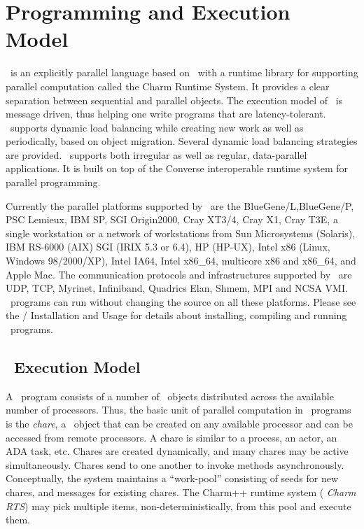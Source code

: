 \section{Programming and Execution Model}

\charmpp\ is an explicitly parallel language based on \CC\ with a runtime
library for supporting parallel computation called the Charm Runtime System.  It
provides a clear separation between sequential and parallel objects.  The
execution model of \charmpp\ is message driven, thus helping one write programs
that are latency-tolerant.  \charmpp\ supports dynamic load balancing while
creating new work as well as periodically, based on object migration.  Several
dynamic load balancing strategies are provided.  \charmpp\ supports both
irregular as well as regular, data-parallel applications.  It is built on top of the
{\sc Converse} interoperable runtime system for parallel programming.

Currently the parallel platforms supported by \charmpp\ are the BlueGene/L,BlueGene/P, PSC
Lemieux, IBM SP, SGI Origin2000, Cray XT3/4, Cray X1, Cray T3E, a single workstation or a
network of workstations from Sun Microsystems (Solaris), IBM RS-6000 (AIX) SGI
(IRIX 5.3 or 6.4), HP (HP-UX), Intel x86 (Linux, Windows 98/2000/XP), Intel
IA64, Intel x86\_64, multicore x86 and x86\_64, and Apple Mac. The communication protocols and infrastructures supported
by \charmpp\ are UDP, TCP, Myrinet, Infiniband, Quadrics Elan, Shmem, MPI and
NCSA VMI.  \charmpp\ programs can run without changing the source on all these
platforms.  Please see the \charmpp{}/\converse{} Installation and
Usage 
for details about installing, compiling and running \charmpp\ programs.

\subsection{\charmpp\ Execution Model}

A \charmpp\ program consists of a number of \charmpp\ objects distributed
across the available number of processors. Thus, the basic unit of parallel
computation in \charmpp\ programs is the {\em chare}, a \charmpp\
object that can be created on any available processor and can be accessed from
remote processors.  A chare is similar to a process, an actor, an
ADA task, etc.  \index{chare}Chares are created dynamically, and many chares
may be active simultaneously.  Chares send \index{message}{\em messages} to one
another to invoke methods asynchronously.  Conceptually, the system maintains a
``work-pool'' consisting of seeds for new \index{chare}chares, and
\index{message}messages for existing chares. The Charm++ runtime system ({\em
Charm RTS}) may pick multiple items, non-deterministically, from this pool
and execute them.  

